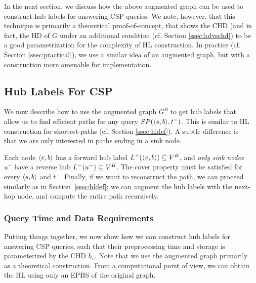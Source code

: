 In the next section, we discuss how the above augmented graph can be used to construct hub labels for answering CSP queries. 
We note, however, that this technique is primarily a theoretical proof-of-concept, that shows the CHD (and in fact, the HD of $G$ under an additional condition (cf. Section \ref{ssec:hdvschd}) to be a good parametrization for the complexity of HL construction.
In practice (cf. Section \ref{ssec:practical}), we use a similar idea of an augmented graph, but with a construction more amenable for implementation.



\subsection{Hub Labels For CSP}
\label{ssec:hlcsp}

We now describe how to use the augmented graph $G^B$ to get hub labels that allow us to find efficient paths for any query $SP(\langle s,b\rangle,t^-)$.
This is similar to HL construction for shortest-paths (cf. Section \ref{ssec:hldef}).
A subtle difference is that we are only interested in paths ending in a sink node.

Each node $\langle v,b\rangle$ has a forward hub label $L^+(\langle v,b\rangle)\subseteq V^B$, and \emph{only sink nodes} $u^-$ have a reverse hub $L^-(u^-)\subseteq V^B$.
The cover property must be satisfied for every $\langle s,b\rangle$ and $t^-$.
Finally, if we want to reconstruct the path, we can proceed similarly as in Section~\ref{ssec:hldef}; we can augment the hub labels with the next-hop node, and compute the entire path recursively.

\subsubsection{Query Time and Data Requirements}
Putting things together, we now show how we can construct hub labels for answering CSP queries, such that their preprocessing time and storage is parameterized by the CHD $h_c$.
Note that we use the augmented graph primarily as a theoretical construction.
From a computational point of view, we can obtain the HL using only an EPHS of the original graph.

